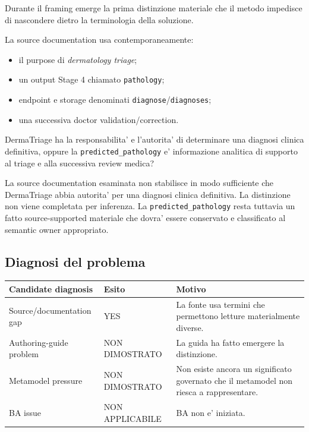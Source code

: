 \documentclass[11pt,a4paper]{article}
\begin{document}
Durante il framing emerge la prima distinzione materiale che il metodo impedisce di nascondere dietro la terminologia della soluzione.

La source documentation usa contemporaneamente:
\begin{itemize}
  \item il purpose di \emph{dermatology triage};
  \item un output Stage 4 chiamato \texttt{pathology};
  \item endpoint e storage denominati \texttt{diagnose}/\texttt{diagnoses};
  \item una successiva doctor validation/correction.
\end{itemize}

\begin{ddtacheck}[title={Smallest critical proposition}]
DermaTriage ha la responsabilita' e l'autorita' di determinare una diagnosi clinica definitiva, oppure la \texttt{predicted\_pathology} e' informazione analitica di supporto al triage e alla successiva review medica?
\end{ddtacheck}

\begin{ddtaopen}[title={Disposition corrente: NOT SPECIFIED}]
La source documentation esaminata non stabilisce in modo sufficiente che DermaTriage abbia autorita' per una diagnosi clinica definitiva. La distinzione non viene completata per inferenza. La \texttt{predicted\_pathology} resta tuttavia un fatto source-supported materiale che dovra' essere conservato e classificato al semantic owner appropriato.
\end{ddtaopen}

\subsection{Diagnosi del problema}

\begin{tabularx}{\textwidth}{L{49mm}L{28mm}Y}
\toprule
\textbf{Candidate diagnosis} & \textbf{Esito} & \textbf{Motivo} \\
\midrule
Source/documentation gap & YES & La fonte usa termini che permettono letture materialmente diverse. \\
Authoring-guide problem & NON DIMOSTRATO & La guida ha fatto emergere la distinzione. \\
Metamodel pressure & NON DIMOSTRATO & Non esiste ancora un significato governato che il metamodel non riesca a rappresentare. \\
BA issue & NON APPLICABILE & BA non e' iniziata. \\
\bottomrule
\end{tabularx}
\end{document}
